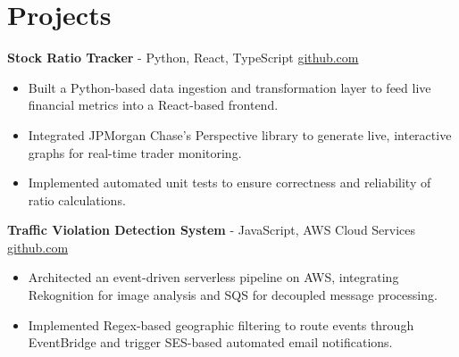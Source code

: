 \documentclass[11pt]{article}
\begin{document}
\vspace{-18.5pt}

\section*{Projects}

\textbf{Stock Ratio Tracker}{ - Python, React, TypeScript} \hfill \href{https://github.com/Monica20030707/Trading-Dashboard_UI}{github.com}
\vspace{-9pt}
\begin{itemize}
  \item Built a Python-based data ingestion and transformation layer to feed live financial metrics into a React-based frontend.
  \item Integrated JPMorgan Chase's Perspective library to generate live, interactive graphs for real-time trader monitoring.
  \item Implemented automated unit tests to ensure correctness and reliability of ratio calculations.
\end{itemize}

\textbf{Traffic Violation Detection System}{ - JavaScript, AWS Cloud Services} \hfill \href{https://github.com/Monica20030707/AWS_rekonigition-N-read-database}{github.com}
\vspace{-9pt}
\begin{itemize}
  \item Architected an event-driven serverless pipeline on AWS, integrating Rekognition for image analysis and SQS for decoupled message processing.
  \item Implemented Regex-based geographic filtering to route events through EventBridge and trigger SES-based automated email notifications.
\end{itemize}

\end{document}
